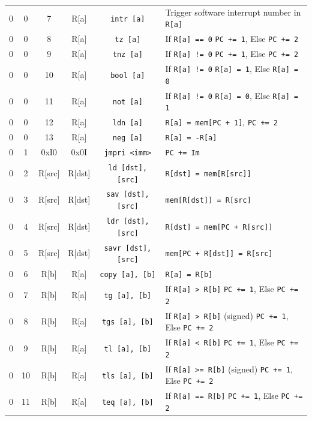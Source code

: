 \documentclass{article}
\begin{document}
\begin{table}[h!]
\begin{footnotesize}
\begin{tabular}{cccc|c|l}
            0 & 0 & 7 & R[a] & \texttt{intr [a]} & Trigger software interrupt number in \texttt{R[a]} \\
            0 & 0 & 8 & R[a] & \texttt{tz [a]} & If \texttt{R[a] == 0} \texttt{PC += 1}, Else \texttt{PC += 2} \\
            0 & 0 & 9 & R[a] & \texttt{tnz [a]} & If \texttt{R[a] != 0} \texttt{PC += 1}, Else \texttt{PC += 2} \\
            0 & 0 & 10 & R[a] & \texttt{bool [a]} & If \texttt{R[a] != 0} \texttt{R[a] = 1}, Else \texttt{R[a] = 0} \\
            0 & 0 & 11 & R[a] & \texttt{not [a]} & If \texttt{R[a] != 0} \texttt{R[a] = 0}, Else \texttt{R[a] = 1} \\
            0 & 0 & 12 & R[a] & \texttt{ldn [a]} & \texttt{R[a] = mem[PC + 1]}, \texttt{PC += 2} \\
            0 & 0 & 13 & R[a] & \texttt{neg [a]} & \texttt{R[a] = -R[a]} \\
            0 & 1 & 0xI0 & 0x0I & \texttt{jmpri <imm>} & \texttt{PC += Im} \\
            0 & 2 & R[src] & R[dst] & \texttt{ld [dst], [src]} & \texttt{R[dst] = mem[R[src]]} \\
            0 & 3 & R[src] & R[dst] & \texttt{sav [dst], [src]} & \texttt{mem[R[dst]] = R[src]} \\
            0 & 4 & R[src] & R[dst] & \texttt{ldr [dst], [src]} & \texttt{R[dst] = mem[PC + R[src]]} \\
            0 & 5 & R[src] & R[dst] & \texttt{savr [dst], [src]} & \texttt{mem[PC + R[dst]] = R[src]} \\
            0 & 6 & R[b] & R[a] & \texttt{copy [a], [b]} & \texttt{R[a] = R[b]} \\
            0 & 7 & R[b] & R[a] & \texttt{tg [a], [b]} & If \texttt{R[a] > R[b]} \texttt{PC += 1}, Else \texttt{PC += 2} \\
            0 & 8 & R[b] & R[a] & \texttt{tgs [a], [b]} & If \texttt{R[a] > R[b]} (signed) \texttt{PC += 1}, Else \texttt{PC += 2} \\
            0 & 9 & R[b] & R[a] & \texttt{tl [a], [b]} & If \texttt{R[a] < R[b]} \texttt{PC += 1}, Else \texttt{PC += 2} \\
            0 & 10 & R[b] & R[a] & \texttt{tls [a], [b]} & If \texttt{R[a] >= R[b]} (signed) \texttt{PC += 1}, Else \texttt{PC += 2} \\
            0 & 11 & R[b] & R[a] & \texttt{teq [a], [b]} & If \texttt{R[a] == R[b]} \texttt{PC += 1}, Else \texttt{PC += 2} \\

\end{tabular}
\end{footnotesize}
\end{table}
\end{document}
